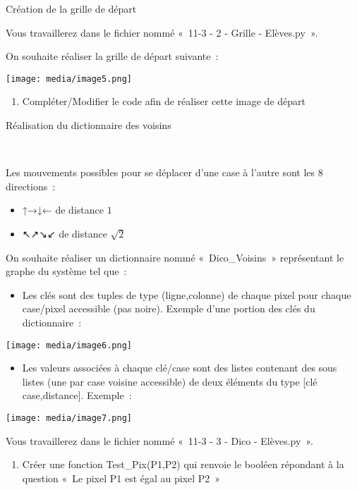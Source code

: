 \documentclass[
]{article}
\begin{document}
Création de la grille de départ

Vous travaillerez dans le fichier nommé «~11-3 - 2 - Grille -
Elèves.py~».

On souhaite réaliser la grille de départ suivante~:

\texttt{[image: media/image5.png]}

\begin{enumerate}
\def\labelenumi{\arabic{enumi}.}
\setcounter{enumi}{1}
\item
  Compléter/Modifier le code afin de réaliser cette image de départ
\end{enumerate}

Réalisation du dictionnaire des voisins

~

Les mouvements possibles pour se déplacer d'une case à l'autre sont les
8 directions~:

\begin{itemize}
\item
  ↑→↓← de distance \(1\)
\item
  ↖↗↘↙ de distance \(\sqrt{2}\)
\end{itemize}

On souhaite réaliser un dictionnaire nommé «~Dico\_Voisins~»
représentant le graphe du système tel que~:

\begin{itemize}
\item
  Les clés sont des tuples de type (ligne,colonne) de chaque pixel pour
  chaque case/pixel accessible (pas noire). Exemple d'une portion des
  clés du dictionnaire~:
\end{itemize}

\texttt{[image: media/image6.png]}

\begin{itemize}
\item
  Les valeurs associées à chaque clé/case sont des listes contenant des
  sous listes (une par case voisine accessible) de deux éléments du type
  {[}clé case,distance{]}. Exemple~:
\end{itemize}

\texttt{[image: media/image7.png]}

Vous travaillerez dans le fichier nommé «~11-3 - 3 - Dico - Elèves.py~».

\begin{enumerate}
\def\labelenumi{\arabic{enumi}.}
\item
  Créer une fonction Test\_Pix(P1,P2) qui renvoie le booléen répondant à
  la question «~Le pixel P1 est égal au pixel P2~»
\end{enumerate}
\end{document}
